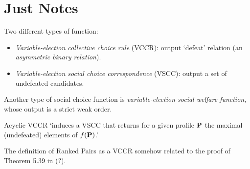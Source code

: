 \chapter{Just Notes}

Two different types of function: 
\begin{itemize}
    \item \emph{Variable-election collective choice rule} (VCCR): output `defeat' relation (an \emph{asymmetric binary relation}).
    \item \emph{Variable-election social choice correspondence} (VSCC): output a set of undefeated candidates.
\end{itemize}

Another type of social choice function is \emph{variable-election social welfare function}, whose output is a strict weak order.

Acyclic VCCR `induces a VSCC that returns for a given profile $\mathbf{P}$ the maximal (undefeated) elements of $f (\mathbf{P})$.'

The definition of Ranked Pairs as a VCCR somehow related to the proof of Theorem 5.39 in \textcite{Holliday2020} (?).